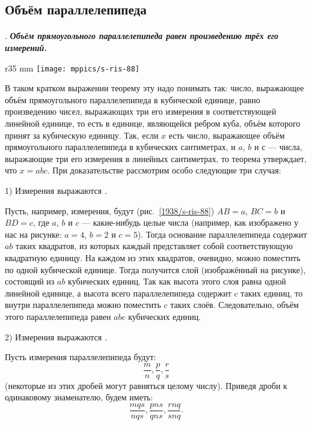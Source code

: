 \subsection*{Объём параллелепипеда}

\paragraph{}\label{1938/s84}
.
\textbf{\emph{Объём прямоугольного параллелепипеда равен произведению трёх его измерений.}}

\begin{wrapfigure}{r}{35 mm}
\vskip-0mm
\centering
\texttt{[image: mppics/s-ris-88]}
\caption{}\label{1938/s-ris-88}
\vskip-0mm
\end{wrapfigure}

В таком кратком выражении теорему эту надо понимать так: число, выражающее объём прямоугольного параллелепипеда в кубической единице, равно произведению чисел, выражающих три его измерения в соответствующей линейной единице, то есть в единице, являющейся ребром куба, объём которого принят за кубическую единицу.
Так, если $x$ есть число, выражающее объём прямоугольного параллелепипеда в кубических сантиметрах, и $a$, $b$ и с — числа, выражающие три его измерения в линейных сантиметрах, то теорема утверждает, что $x=abc$.
При доказательстве рассмотрим особо следующие три случая:


1) Измерения выражаются .

Пусть, например, измерения, будут (рис.~\ref{1938/s-ris-88}) $AB=a$, $BC=b$ и $BD=c$, где $a$, $b$ и $c$ — какие-нибудь целые числа (например, как изображено у нас на рисунке: $a=4$, $b=2$ и $c=5$).
Тогда основание параллелепипеда содержит $ab$ таких квадратов, из которых каждый представляет собой соответствующую квадратную единицу.
На каждом из этих квадратов, очевидно, можно поместить по одной кубической единице.
Тогда получится слой (изображённый на рисунке), состоящий из $ab$ кубических единиц.
Так как высота этого слоя равна одной линейной единице, а высота всего параллелепипеда содержит $c$ таких единиц, то внутри параллелепипеда можно поместить $c$ таких слоёв.
Следовательно, объём этого параллелепипеда равен $abc$ кубических единиц.

2) Измерения выражаются .

Пусть измерения параллелепипеда будут:
\[\frac mn, \frac pq, \frac rs\]
(некоторые из этих дробей могут равняться целому числу).
Приведя дроби к одинаковому знаменателю, будем иметь:
\[\frac {mqs}{nqs}, \frac {pns}{qns}, \frac {rnq}{snq}.\]

